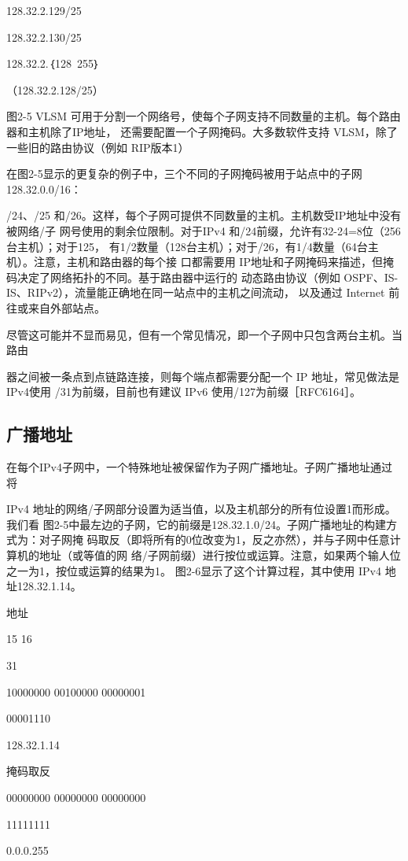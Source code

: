 128.32.2.129/25

128.32.2.130/25

128.32.2.｛128~255｝

（128.32.2.128/25）

图2-5 VLSM 可用于分割一个网络号，使每个子网支持不同数量的主机。每个路由器和主机除了IP地址，
还需要配置一个子网掩码。大多数软件支持 VLSM，除了一些旧的路由协议（例如 RIP版本1）

在图2-5显示的更复杂的例子中，三个不同的子网掩码被用于站点中的子网128.32.0.0/16：

/24、/25 和/26。这样，每个子网可提供不同数量的主机。主机数受IP地址中没有被网络/子
网号使用的剩余位限制。对于IPv4 和/24前缀，允许有32-24=8位（256台主机）；对于125，
有1/2数量（128台主机）；对于/26，有1/4数量（64台主机）。注意，主机和路由器的每个接
口都需要用 IP地址和子网掩码来描述，但掩码决定了网络拓扑的不同。基于路由器中运行的
动态路由协议（例如 OSPF、IS-IS、RIPv2），流量能正确地在同一站点中的主机之间流动，
以及通过 Internet 前往或来自外部站点。

尽管这可能并不显而易见，但有一个常见情况，即一个子网中只包含两台主机。当路由

器之间被一条点到点链路连接，则每个端点都需要分配一个 IP 地址，常见做法是IPv4使用
/31为前缀，目前也有建议 IPv6 使用/127为前缀［RFC6164］。

\subsection{广播地址}
在每个IPv4子网中，一个特殊地址被保留作为子网广播地址。子网广播地址通过将

IPv4 地址的网络/子网部分设置为适当值，以及主机部分的所有位设置1而形成。我们看
图2-5中最左边的子网，它的前缀是128.32.1.0/24。子网广播地址的构建方式为：对子网掩
码取反（即将所有的0位改变为1，反之亦然），并与子网中任意计算机的地址（或等值的网
络/子网前缀）进行按位或运算。注意，如果两个输人位之一为1，按位或运算的结果为1。
图2-6显示了这个计算过程，其中使用 IPv4 地址128.32.1.14。

地址

15 16

31

10000000 00100000 00000001

00001110

128.32.1.14

掩码取反

00000000 00000000 00000000

11111111

0.0.0.255

